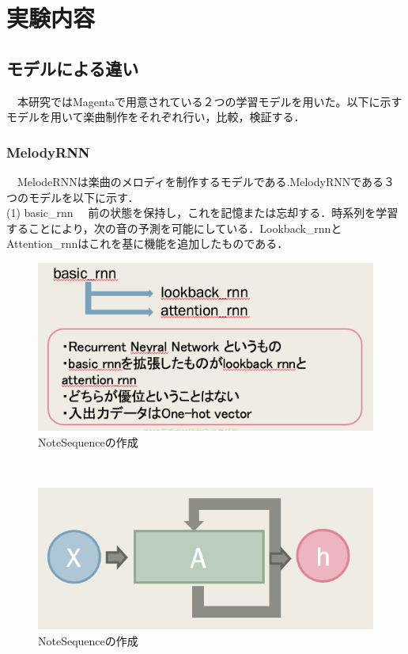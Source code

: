 \chapter{実験内容}
\section{モデルによる違い}
　本研究ではMagentaで用意されている２つの学習モデルを用いた。以下に示すモデルを用いて楽曲制作をそれぞれ行い，比較，検証する．\\
\subsection{MelodyRNN}
　MelodeRNNは楽曲のメロディを制作するモデルである.MelodyRNNである３つのモデルを以下に示す．\\
(1) basic\_rnn
　前の状態を保持し，これを記憶または忘却する．時系列を学習することにより，次の音の予測を可能にしている．Lookback\_rnnとAttention\_rnnはこれを基に機能を追加したものである．\\
\begin{figure}[!ht]
    \begin{screen}
    \begin{center}
        \includegraphics[scale=0.8, clip]{./img/basic1.png}
        \caption{NoteSequenceの作成}
        \label{fig:NoteSequenceの作成}
    \end{center}
    \end{screen}
\end{figure}\\
\begin{figure}[!ht]
    \begin{screen}
    \begin{center}
        \includegraphics[scale=1, clip]{./img/basic3.png}
        \caption{NoteSequenceの作成}
        \label{fig:NoteSequenceの作成}
    \end{center}
    \end{screen}
\end{figure}\\
